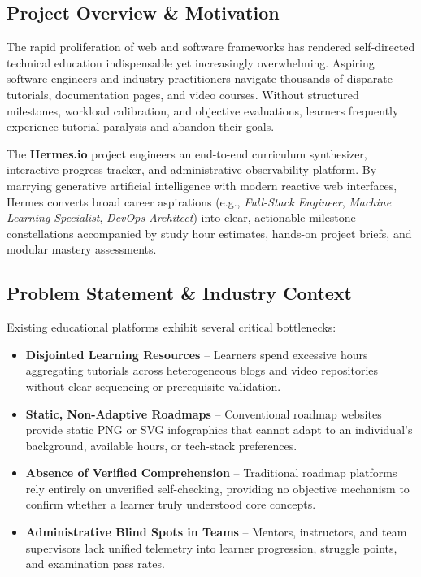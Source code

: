 \documentclass[12pt,a4paper]{article}
\begin{document}
\subsection{Project Overview \& Motivation}
The rapid proliferation of web and software frameworks has rendered self-directed technical education indispensable yet increasingly overwhelming. Aspiring software engineers and industry practitioners navigate thousands of disparate tutorials, documentation pages, and video courses. Without structured milestones, workload calibration, and objective evaluations, learners frequently experience tutorial paralysis and abandon their goals. 

The \textbf{Hermes.io} project engineers an end-to-end curriculum synthesizer, interactive progress tracker, and administrative observability platform. By marrying generative artificial intelligence with modern reactive web interfaces, Hermes converts broad career aspirations (e.g., \textit{Full-Stack Engineer}, \textit{Machine Learning Specialist}, \textit{DevOps Architect}) into clear, actionable milestone constellations accompanied by study hour estimates, hands-on project briefs, and modular mastery assessments.

\subsection{Problem Statement \& Industry Context}
Existing educational platforms exhibit several critical bottlenecks:
\begin{itemize}[leftmargin=1.5em, itemsep=6pt]
    \item \textbf{Disjointed Learning Resources} -- Learners spend excessive hours aggregating tutorials across heterogeneous blogs and video repositories without clear sequencing or prerequisite validation.
    \item \textbf{Static, Non-Adaptive Roadmaps} -- Conventional roadmap websites provide static PNG or SVG infographics that cannot adapt to an individual's background, available hours, or tech-stack preferences.
    \item \textbf{Absence of Verified Comprehension} -- Traditional roadmap platforms rely entirely on unverified self-checking, providing no objective mechanism to confirm whether a learner truly understood core concepts.
    \item \textbf{Administrative Blind Spots in Teams} -- Mentors, instructors, and team supervisors lack unified telemetry into learner progression, struggle points, and examination pass rates.
\end{itemize}
\end{document}
